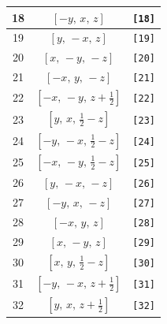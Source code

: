 \documentclass[fleqn,8pt]{jsarticle}
\begin{document}
\begin{longtable}{ccc}
18 & $\left[ - y,\, x,\, z \right]$ & {\tt [18]} \\ \hline
19 & $\left[ y,\, - x,\, z \right]$ & {\tt [19]} \\ \hline
20 & $\left[ x,\, - y,\, - z \right]$ & {\tt [20]} \\ \hline
21 & $\left[ - x,\, y,\, - z \right]$ & {\tt [21]} \\ \hline
22 & $\left[ - x,\, - y,\, z + \frac{1}{2} \right]$ & {\tt [22]} \\ \hline
23 & $\left[ y,\, x,\, \frac{1}{2} - z \right]$ & {\tt [23]} \\ \hline
24 & $\left[ - y,\, - x,\, \frac{1}{2} - z \right]$ & {\tt [24]} \\ \hline
25 & $\left[ - x,\, - y,\, \frac{1}{2} - z \right]$ & {\tt [25]} \\ \hline
26 & $\left[ y,\, - x,\, - z \right]$ & {\tt [26]} \\ \hline
27 & $\left[ - y,\, x,\, - z \right]$ & {\tt [27]} \\ \hline
28 & $\left[ - x,\, y,\, z \right]$ & {\tt [28]} \\ \hline
29 & $\left[ x,\, - y,\, z \right]$ & {\tt [29]} \\ \hline
30 & $\left[ x,\, y,\, \frac{1}{2} - z \right]$ & {\tt [30]} \\ \hline
31 & $\left[ - y,\, - x,\, z + \frac{1}{2} \right]$ & {\tt [31]} \\ \hline
32 & $\left[ y,\, x,\, z + \frac{1}{2} \right]$ & {\tt [32]} \\
\end{longtable}
\end{document}
